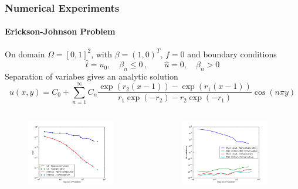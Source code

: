 \documentclass[18pt,xcolor=table]{beamer}
\begin{document}
\begin{frame}
\frametitle{Numerical Experiments}
\framesubtitle{Erickson-Johnson Problem}
On domain $\Omega=[0,1]^2$, with $\beta=(1,0)^T$, $f=0$ and boundary
conditions
\[
\hat t=u_0,\quad\beta_n\le0\,,\quad\quad\hat u=0,\quad\beta_n > 0
\]
Separation of variabes gives an analytic solution
\[
u(x,y)=C_0+\sum_{n=1}^\infty C_n
\frac{\exp(r_2(x-1))-\exp(r_1(x-1))}{r_1\exp(-r_2)-r_2\exp(-r_1)}
\cos(n\pi y)
\]
\vspace{-5ex}
\begin{columns}[b]
\begin{column}{0.5\textwidth}
\begin{figure}[t]
\centering
\includegraphics[width=0.9\textwidth]{Erickson/modifiedError.pdf}

\end{figure}
\end{column}
\begin{column}{0.5\textwidth}
\begin{figure}[t]
\centering
\includegraphics[width=0.9\textwidth]{Erickson/modifiedFlux.pdf}

\end{figure}
\end{column}
\end{columns}
\end{frame}

\end{document}
